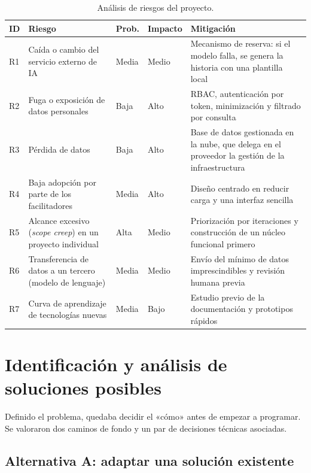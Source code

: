 \documentclass[11pt,oneside,spanish,listoffigures,listoftables]{tfgetsinf}
\begin{document}
\begin{table}[ht]
\centering
\caption[Análisis de riesgos del proyecto]{Análisis de riesgos del proyecto.}
\label{tab:riesgos}
\footnotesize
\renewcommand{\arraystretch}{1.3}
\begin{tabularx}{\textwidth}{%
  >{\raggedright\arraybackslash}p{0.9cm}%
  >{\raggedright\arraybackslash}X%
  >{\raggedright\arraybackslash}p{1.5cm}%
  >{\raggedright\arraybackslash}p{1.3cm}%
  >{\raggedright\arraybackslash}X}
\toprule
\textbf{ID} & \textbf{Riesgo} & \textbf{Prob.} & \textbf{Impacto} & \textbf{Mitigación} \\
\midrule
R1 & Caída o cambio del servicio externo de IA & Media & Medio & Mecanismo de reserva: si el modelo falla, se genera la historia con una plantilla local \\
R2 & Fuga o exposición de datos personales & Baja & Alto & RBAC, autenticación por token, minimización y filtrado por consulta \\
R3 & Pérdida de datos & Baja & Alto & Base de datos gestionada en la nube, que delega en el proveedor la gestión de la infraestructura \\
R4 & Baja adopción por parte de los facilitadores & Media & Alto & Diseño centrado en reducir carga y una interfaz sencilla \\
R5 & Alcance excesivo (\textit{scope creep}) en un proyecto individual & Alta & Medio & Priorización por iteraciones y construcción de un núcleo funcional primero \\
R6 & Transferencia de datos a un tercero (modelo de lenguaje) & Media & Medio & Envío del mínimo de datos imprescindibles y revisión humana previa \\
R7 & Curva de aprendizaje de tecnologías nuevas & Media & Bajo & Estudio previo de la documentación y prototipos rápidos \\
\bottomrule
\end{tabularx}
\end{table}

\section{Identificación y análisis de soluciones posibles}

Definido el problema, quedaba decidir el «cómo» antes de empezar a programar. Se valoraron dos caminos de fondo y un par de decisiones técnicas asociadas.

\subsection{Alternativa A: adaptar una solución existente}
\end{document}
